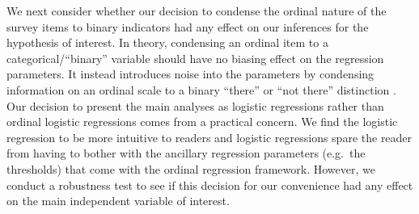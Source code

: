 \documentclass[11pt,]{article}
\begin{document}
We next consider whether our decision to condense the ordinal nature of
the survey items to binary indicators had any effect on our inferences
for the hypothesis of interest. In theory, condensing an ordinal item to
a categorical/``binary'' variable should have no biasing effect on the
regression parameters. It instead introduces noise into the parameters
by condensing information on an ordinal scale to a binary ``there'' or
``not there'' distinction \citep{berryfeldman1985mrp}. Our decision to
present the main analyses as logistic regressions rather than ordinal
logistic regressions comes from a practical concern. We find the
logistic regression to be more intuitive to readers and logistic
regressions spare the reader from having to bother with the ancillary
regression parameters (e.g.~the thresholds) that come with the ordinal
regression framework. However, we conduct a robustness test to see if
this decision for our convenience had any effect on the main independent
variable of interest.
\end{document}
